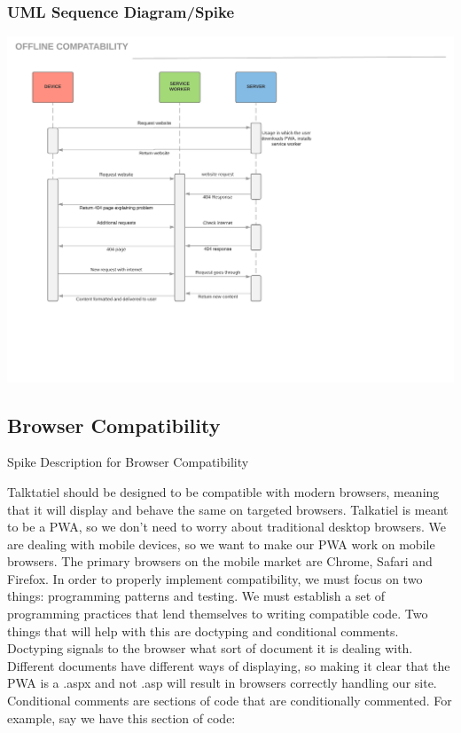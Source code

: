 \documentclass[12pt]{article}
\begin{document}
\subsubsection{UML Sequence Diagram/Spike}
\includegraphics[scale=0.5]{img/10.png}\linebreak

\subsection{Browser Compatibility}
Spike Description for Browser Compatibility

Talktatiel should be designed to be compatible with modern browsers, meaning that it will display and behave the same on targeted browsers.  Talkatiel is meant to be a PWA, so we don’t need to worry about traditional desktop browsers.  We are dealing with mobile devices, so we want to make our PWA work on mobile browsers.  The primary browsers on the mobile market are Chrome, Safari and Firefox.  In order to properly implement compatibility, we must focus on two things: programming patterns and testing.  We must establish a set of programming practices that lend themselves to writing compatible code.  Two things that will help with this are doctyping and conditional comments.  Doctyping signals to the browser what sort of document it is dealing with.  Different documents have different ways of displaying, so making it clear that the PWA is a .aspx and not .asp will result in browsers correctly handling our site.  Conditional comments are sections of code that are conditionally commented.  For example, say we have this section of code:
\end{document}
